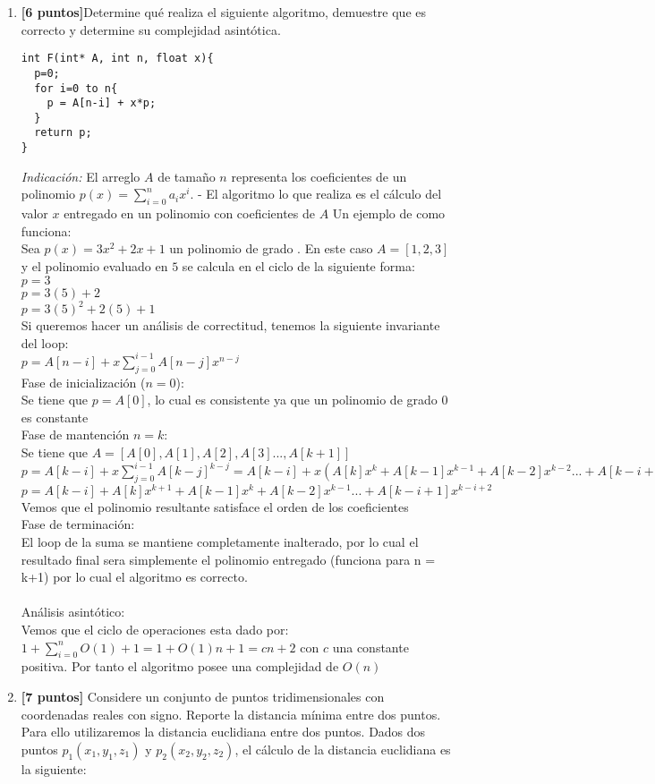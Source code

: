 \documentclass[10pt]{article}
\begin{document}
\begin{enumerate}
\item \textbf{[6 puntos]}Determine qué realiza el siguiente algoritmo, demuestre que es correcto y determine su complejidad asintótica.

\begin{scriptsize}
\begin{verbatim}
int F(int* A, int n, float x){
  p=0;
  for i=0 to n{
    p = A[n-i] + x*p;
  }
  return p;
}
\end{verbatim}
\end{scriptsize}
\textit{Indicación:} El arreglo $A$ de tamaño $n$ representa los coeficientes de un polinomio $p(x)=\sum_{i=0}^na_ix^i$.
- El algoritmo lo que realiza es el cálculo del valor $x$ entregado en un polinomio con coeficientes de $A$ Un ejemplo de como funciona:\\
Sea $p(x)=3x^2+2x+1$ un polinomio de grado . En este caso $A=[1,2,3]$ y el polinomio evaluado en $5$ se calcula en el ciclo de la siguiente forma:\\$p=3$\\$p=3(5)+2$\\$p=3(5)^2+2(5)+1$\\Si queremos hacer un análisis de correctitud, tenemos la siguiente invariante del loop:\\$p=A[n-i]+x\sum_{j=0}^{i-1}A[n-j]x^{n-j}$\\Fase de inicialización ($n = 0$):\\Se tiene que $p=A[0]$, lo cual es consistente ya que un polinomio de grado 0 es constante\\
Fase de mantención $n = k$:\\Se tiene que $A=[A[0],A[1],A[2],A[3]...,A[k+1]]$\\
$p=A[k-i]+x\sum_{j=0}^{i-1}A[k-j]^{k-j}=A[k-i]+x(A[k]x^k+A[k-1]x^{k-1}+A[k-2]x^{k-2}...+A[k-i+1]x^{k-i+1})$\\$p=A[k-i]+A[k]x^{k+1}+A[k-1]x^{k}+A[k-2]x^{k-1}...+A[k-i+1]x^{k-i+2}$\\Vemos que el polinomio resultante satisface el orden de los coeficientes\\Fase de terminación:\\El loop de la suma se mantiene completamente inalterado, por lo cual el resultado final sera simplemente el polinomio entregado (funciona para n = k+1) por lo cual el algoritmo es correcto.\\\\Análisis asintótico:\\Vemos que el ciclo de operaciones esta dado por:\\$1+\sum_{i=0}^{n}O(1)+1=1+O(1)n+1=cn+2$ con $c$ una constante positiva. Por tanto el algoritmo posee una complejidad de $O(n)$
\item \textbf{[7 puntos]} Considere un conjunto de puntos tridimensionales con coordenadas reales con signo. Reporte la distancia mínima entre dos puntos. Para ello utilizaremos la distancia euclidiana entre dos puntos. Dados dos puntos $p_1(x_1,y_1,z_1)$ y $p_2(x_2,y_2,z_2)$, el cálculo de la distancia euclidiana es la siguiente:


\end{enumerate}
\end{document}

